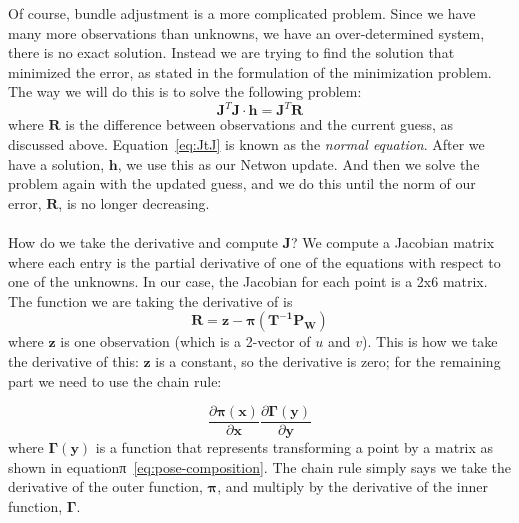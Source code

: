 \documentclass{article}
\begin{document}
Of course, bundle adjustment is a more complicated problem.  Since we
have many more observations than unknowns, we have an over-determined
system, there is no exact solution.  Instead we are trying to find the
solution that minimized the error, as stated in the formulation of the
minimization problem.  The way we will do this is to solve
the following problem:
\begin{equation}
  \label{eq:JtJ}
  \mathbf{J}^T\mathbf{J}\cdot\mathbf{h} = \mathbf{J}^T\mathbf{R}
\end{equation}
where $\mathbf{R}$ is the difference between observations and the
current guess, as discussed above.  Equation~\ref{eq:JtJ} is known as
the \emph{normal equation}.  After we have a solution, $\mathbf{h}$,
we use this as our Netwon update.  And then we solve the problem
again with the updated guess, and we do this until the norm of our
error, $\mathbf{R}$, is no longer decreasing.
\\
\\
How do we take the derivative and compute $\mathbf{J}$?  We compute a
Jacobian matrix where each entry is the partial derivative of one of
the equations with respect to one of the unknowns.  In our case, the
Jacobian for each point is a 2x6 matrix.  The function we are taking
the derivative of is
\begin{equation}
  \label{eq:deriv}
  \mathbf{R} = \mathbf{z} - \boldsymbol{\pi}(\mathbf{T^{-1}}\mathbf{P_{W}})
\end{equation}
where $\mathbf{z}$ is one observation (which is a 2-vector of $u$ and
$v$).  This is how we take the derivative of this: $\mathbf{z}$ is a
constant, so the derivative is zero; for the remaining part we need to
use the chain rule:

\begin{equation}
  \label{eq:chain-rule}
  \frac{\partial\boldsymbol{\pi}(\mathbf{x})}{\partial\mathbf{x}} \frac{\partial\mathbf{\Gamma}(\mathbf{y})}{\partial\mathbf{y}}
\end{equation}
where $\mathbf{\Gamma}(\mathbf{y})$ is a function that represents
transforming a point by a matrix as shown in
equationπ~\ref{eq:pose-composition}.  The chain rule simply says we
take the derivative of the outer function, $\boldsymbol{\pi}$, and
multiply by the derivative of the inner function, $\mathbf{\Gamma}$.
\end{document}

